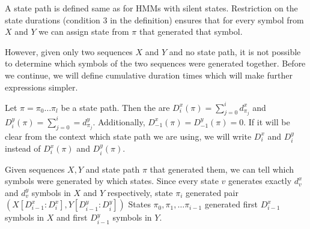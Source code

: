 A state path is defined same as for HMMs with silent states. Restriction on the
state durations (condition $3$ in the definition) ensures
that for every symbol from $X$ and $Y$ we can assign state from $\pi$ that
generated that symbol.

However, given only two sequences $X$ and $Y$ and no state path, it is not
possible 
to determine which symbols of the two sequences were generated together. Before we
continue, we will define cumulative duration times which will make further
expressions simpler.

\begin{definition}
Let $\pi=\pi_0\dots\pi_l$ be a state path. Then the  are
$D^x_i(\pi)=\sum_{j=0}^{i}d^x_{\pi_j}$ and $D^y_i(\pi)=\sum_{j=0}^{i}=d^y_{\pi_j}$.
Additionally, $D^x_{-1}(\pi)=D^y_{-1}(\pi)=0$. If it will be clear from the context
which state path we are using, we will write $D^x_i$ and $D^y_i$ instead of
$D^x_i(\pi)$ and $D^y_i(\pi)$.
\end{definition}

Given sequences $X,Y$ and state path $\pi$ that generated them, we 
can tell which symbols were generated by which states. Since every state $v$
generates exactly $d^x_v$ and $d^y_v$ symbols in $X$ and $Y$ respectively,
state $\pi_i$ generated pair $(X[D^x_{i-1}:D^x_{i}],Y[D^y_{i-1}:D^y_{i}])$
States $\pi_0,\pi_1,\dots\pi_{i-1}$ generated first $D^x_{i-1}$ symbols in $X$
and first $D^y_{i-1}$ symbols in $Y$. 



